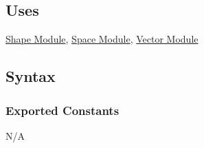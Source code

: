 \documentclass[12pt]{article}
\newcommand{\Shape}{\hyperref[MISShape]{Shape Module}}
\newcommand{\Space}{\hyperref[MISSpace]{Space Module}}
\newcommand{\Vector}{\hyperref[MISVector]{Vector Module}}
\newcommand{\Transform}{\hyperref[MISTransform]{Transform Matrix Module}}
\newcommand{\SpatialIndex}{\hyperref[MISSpatial]{Spatial Index Module}}
\newcommand{\Sequence}{\hyperref[MISSequence]{Sequence Data Structure Module}}
\begin{document}
\subsection{Uses} \label{SecUBody}
	\Shape, \Space, \Vector %
	
\subsection{Syntax}

\subsubsection{Exported Constants}

N/A

	
\end{document}
